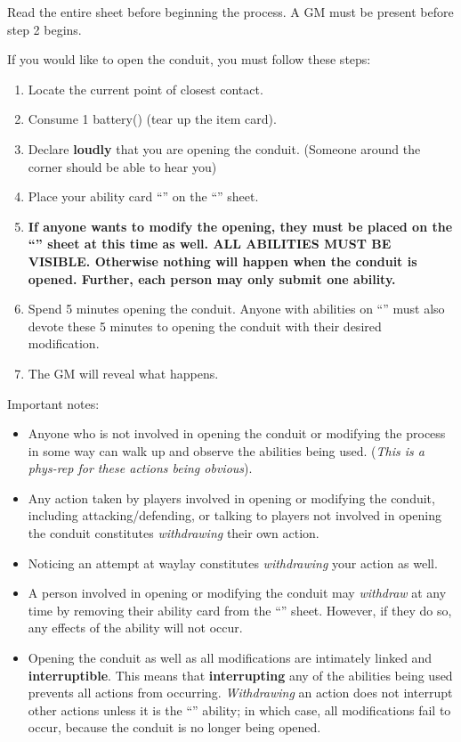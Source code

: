 \documentclass[green]{elementals}
\begin{document}
\name{\gSealingLocations{}}

Read the entire sheet before beginning the process. A GM must be present before step 2 begins.


If you would like to open the conduit, you must follow these steps:
\begin{enumerate}
  \item Locate the current point of closest contact.
  \item Consume 1 battery(\iBattery{\MYnumber{}}) (tear up the item card).
  \item Declare {\bf loudly} that you are opening the conduit. (Someone around the corner should be able to hear you)
  \item Place your ability card ``\aWorkConduit{}'' on the ``\gConduitModifier{}'' sheet.
  \item {\bf If anyone wants to modify the opening, they must be placed on the ``\gConduitModifier{}'' sheet at this time as well. ALL ABILITIES MUST BE VISIBLE. Otherwise nothing will happen when the conduit is opened. Further, each person may only submit {\bf one} ability.}
  \item Spend 5 minutes opening the conduit. Anyone with abilities on ``\gConduitModifier{}'' must also devote these 5 minutes to opening the conduit with their desired modification.
  \item The GM will reveal what happens.
\end{enumerate}

Important notes:
\begin{itemize}
  \item Anyone who is not involved in opening the conduit or modifying the process in some way can walk up and observe the abilities being used. (\emph{This is a phys-rep for these actions being obvious}).
  \item Any action taken by players involved in opening or modifying the conduit, including attacking/defending, or talking to players not involved in opening the conduit constitutes \emph{withdrawing} their own action.
  \item Noticing an attempt at waylay constitutes \emph{withdrawing} your action as well.
  \item A person involved in opening or modifying the conduit may \emph{withdraw} at any time by removing their ability card from the ``\gConduitModifier{}'' sheet. However, if they do so, any effects of the ability will not occur.
  \item Opening the conduit as well as all modifications are intimately linked and {\bf interruptible}. This means that {\bf interrupting} any of the abilities being used prevents all actions from occurring. \emph{Withdrawing} an action does not interrupt other actions unless it is the ``\aWorkConduit{}'' ability; in which case, all modifications fail to occur, because the conduit is no longer being opened.
\end{itemize}
\end{document}
